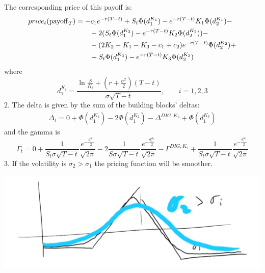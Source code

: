 \begin{example}{}{}{}
\begin{itemize}
    \end{itemize}
    The corresponding price of this payoff is:
    \begin{align} %
        \notag price_t(\pay_T) &= -c_1e^{-r(T-t)} + S_t\Phi(d_1^{K_1}) - e^{-r(T-t)}K_1\Phi(d_2^{K_1}) - \\
        &\qquad
        \notag - 2(S_t\Phi(d_1^{K_2})-e^{-r(T-t)}K_2\Phi(d_2^{K_2})) - \\
        &\qquad
        \notag - (2K_2-K_1-K_3-c_1+c_2)e^{-r(T-t)}\Phi(d_2^{K_2}) + \\
        &\qquad
        + S_t\Phi(d_1^{K_3}) - e^{-r(T-t)}K_3\Phi(d_2^{K_3})
    \end{align}
    where
    \begin{equation}
        d_1^{K_i} = \dfrac{\ln\frac{S}{K_i}+\left(r+\frac{\sigma^2}{2}\right)(T-t)}{\sigma\sqrt{T-t}}, \qquad i = 1,2,3
    \end{equation}
    2. The delta is given by the sum of the building blocks' deltas:
    \begin{align}
        \Delta_t = 0 + \Phi(d_1^{K_1}) - 2\Phi(d_1^{K_2}) - \Delta^{DIG, K_2} + \Phi(d_1^{K_3}) 
    \end{align}
    and the gamma is 
    \begin{equation}
        \Gamma_t = 0 + \dfrac{1}{S_t\sigma\sqrt{T-t}}\dfrac{e^{-\frac{d_1^{K_1}}{2}}}{\sqrt{2\pi}} - 2\dfrac{1}{S\sigma\sqrt{T-t}}\dfrac{e^{-\frac{d_1^{K_2}}{2}}}{\sqrt{2\pi}} - \Gamma^{DIG,K_2} + \dfrac{1}{S_t\sigma\sqrt{T-t}}\dfrac{e^{-\frac{d_1^{K_3}}{2}}}{\sqrt{2\pi}}
    \end{equation}
    3. If the volatility is $\sigma_2>\sigma_1$ the pricing function will be smoother. %
    \begin{center}
        \includegraphics[scale=0.3]{fig/tmp/fig29.png}
    \end{center} 
\end{example}

